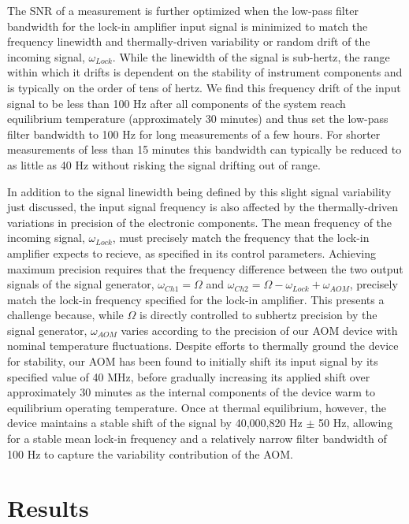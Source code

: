 \documentclass[%
  reprint,
  superscriptaddress,
  amsmath,amssymb,
  aps,
  prapplied,
]{revtex4-2}
\begin{document}
The SNR of a measurement is further optimized when the low-pass filter bandwidth for the lock-in amplifier input signal is minimized to match the frequency linewidth and thermally-driven variability or random drift of the incoming signal, $\omega_{Lock}$. While the linewidth of the signal is sub-hertz, the range within which it drifts is dependent on the stability of instrument components and is typically on the order of tens of hertz. We find this frequency drift of the input signal to be less than 100 Hz after all components of the system reach equilibrium temperature (approximately 30 minutes) and thus set the low-pass filter bandwidth to 100 Hz for long measurements of a few hours. For shorter measurements of less than 15 minutes this bandwidth can typically be reduced to as little as 40 Hz without risking the signal drifting out of range.

In addition to the signal linewidth being defined by this slight signal variability just discussed, the input signal frequency is also affected by the thermally-driven variations in precision of the electronic components. The mean frequency of the incoming signal, $\omega_{Lock}$, must precisely match the frequency that the lock-in amplifier expects to recieve, as specified in its control parameters. Achieving maximum precision requires that the frequency difference between the two output signals of the signal generator, $\omega_{Ch1} = \Omega$ and $\omega_{Ch2} = \Omega - \omega_{Lock} + \omega_{AOM}$, precisely match the lock-in frequency specified for the lock-in amplifier. This presents a challenge because, while $\Omega$ is directly controlled to subhertz precision by the signal generator, $\omega_{AOM}$ varies according to the precision of our AOM device with nominal temperature fluctuations. Despite efforts to thermally ground the device for stability, our AOM has been found to initially shift its input signal by its specified value of 40 MHz, before gradually increasing its applied shift over approximately 30 minutes as the internal components of the device warm to equilibrium operating temperature. Once at thermal equilibrium, however, the device maintains a stable shift of the signal by 40,000,820 Hz $\pm$ 50 Hz, allowing for a stable mean lock-in frequency and a relatively narrow filter bandwidth of 100 Hz to capture the variability contribution of the AOM.

\section{Results}\label{Results}
\end{document}

